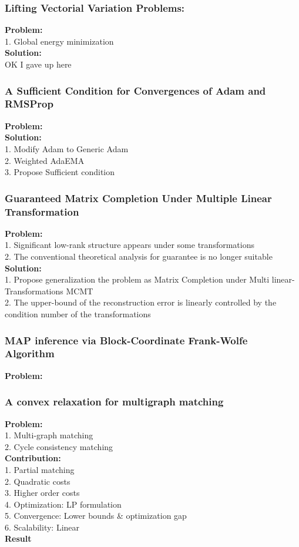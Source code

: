 \subsubsection{Lifting Vectorial Variation Problems:}
    {\bf Problem:} \\
        1. Global energy minimization \\
    {\bf Solution:} \\
    OK I gave up here \\
\subsubsection{A Sufficient Condition for Convergences of Adam and RMSProp}
    {\bf Problem:} \\
    {\bf Solution:} \\
        1. Modify Adam to Generic Adam \\
        2. Weighted AdaEMA \\
        3. Propose Sufficient condition \\
\subsubsection{Guaranteed Matrix Completion Under Multiple Linear Transformation}
    {\bf Problem:} \\
        1. Significant low-rank structure appears under some transformations \\
        2. The conventional theoretical analysis for guarantee is no longer suitable \\
    {\bf Solution:} \\
        1. Propose generalization the problem as Matrix Completion under Multi linear-Transformations MCMT \\
        2. The upper-bound of the reconstruction error is linearly controlled by the condition number of the transformations \\
\subsubsection{MAP inference via Block-Coordinate Frank-Wolfe Algorithm}
    {\bf Problem:} \\
\subsubsection{A convex relaxation for multigraph matching}
    {\bf Problem:} \\
        1. Multi-graph matching \\
        2. Cycle consistency matching \\
    {\bf Contribution:} \\
        1. Partial matching \\
        2. Quadratic costs \\
        3. Higher order costs \\
        4. Optimization: LP formulation \\
        5. Convergence: Lower bounds \& optimization gap \\
        6. Scalability: Linear \\
    {\bf Result} \\